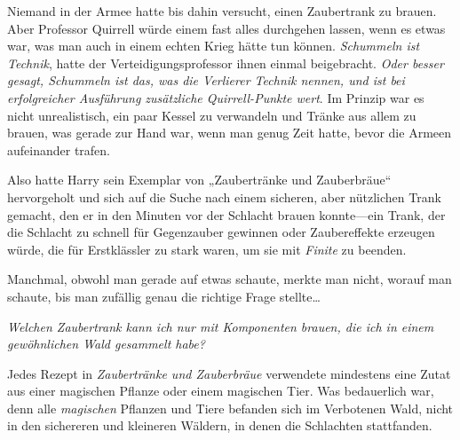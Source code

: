 Niemand in der Armee hatte bis dahin versucht, einen Zaubertrank zu brauen. Aber Professor Quirrell würde einem fast alles durchgehen lassen, wenn es etwas war, was man auch in einem echten Krieg hätte tun können. \emph{Schummeln ist Technik}, hatte der Verteidigungsprofessor ihnen einmal beigebracht. \emph{Oder besser gesagt, Schummeln ist das, was die Verlierer Technik nennen, und ist bei erfolgreicher Ausführung zusätzliche Quirrell-Punkte wert}. Im Prinzip war es nicht unrealistisch, ein paar Kessel zu verwandeln und Tränke aus allem zu brauen, was gerade zur Hand war, wenn man genug Zeit hatte, bevor die Armeen aufeinander trafen.

Also hatte Harry sein Exemplar von „Zaubertränke und Zauberbräue“ hervorgeholt und sich auf die Suche nach einem sicheren, aber nützlichen Trank gemacht, den er in den Minuten vor der Schlacht brauen konnte—ein Trank, der die Schlacht zu schnell für Gegenzauber gewinnen oder Zaubereffekte erzeugen würde, die für Erstklässler zu stark waren, um sie mit \emph{Finite} zu beenden.

Manchmal, obwohl man gerade auf etwas schaute, merkte man nicht, worauf man schaute, bis man zufällig genau die richtige Frage stellte…

\emph{Welchen Zaubertrank kann ich nur mit Komponenten brauen, die ich in einem gewöhnlichen Wald gesammelt habe?}

Jedes Rezept in \emph{Zaubertränke und Zauberbräue} verwendete mindestens eine Zutat aus einer magischen Pflanze oder einem magischen Tier. Was bedauerlich war, denn alle \emph{magischen} Pflanzen und Tiere befanden sich im Verbotenen Wald, nicht in den sichereren und kleineren Wäldern, in denen die Schlachten stattfanden.

